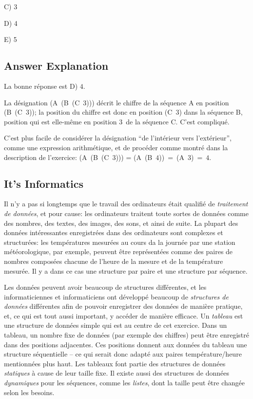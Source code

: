 \documentclass[a4paper,11pt]{report}
\newcommand{\taskGraphicsFolder}{..}
\begin{document}
C) 3

D) 4

E) 5

\endgroup

\subsection*{Answer Explanation}

La bonne réponse est D) $4$.

La désignation (A~(B~(C~$3$))) décrit le chiffre de la séquence A en position (B~(C~$3$)); la position du chiffre est donc en position (C~$3$) dans la séquence B, position qui est elle-même en position $3$~de la séquence C. C’est compliqué.

{\centering%
\par}

C’est plus facile de considérer la désignation “de l’intérieur vers l’extérieur”, comme une expression arithmétique, et de procéder comme montré dans la description de l’exercice: (A~(B~(C~$3$))) = (A~(B~$4$))~=~(A~$3$)~=~$4$.


\subsection*{It’s Informatics}

Il n’y a pas si longtemps que le travail des ordinateurs était qualifié de \emph{traitement de données}, et pour cause: les ordinateurs traitent toute sortes de données comme des nombres, des textes, des images, des sons, et ainsi de suite. La plupart des données intéressantes enregistrées dans des ordinateurs sont complexes et structurées: les températures mesurées au cours da la journée par une station météorologique, par exemple, peuvent être représentées comme des paires de nombres composées chacune de l’heure de la mesure et de la température mesurée. Il y a dans ce cas une structure par paire et une structure par séquence.

Les données peuvent avoir beaucoup de structures différentes, et les informaticiennes et informaticiens ont développé beaucoup de \emph{structures de données} différentes afin de pouvoir enregistrer des données de manière pratique, et, ce qui est tout aussi important, y accéder de manière efficace. Un \emph{tableau} est une structure de données simple qui est au centre de cet exercice. Dans un tableau, un nombre fixe de données (par exemple des chiffres) peut être enregistré dans des positions adjacentes. Ces positions donnent aux données du tableau une structure séquentielle – ce qui serait donc adapté aux paires température/heure mentionnées plus haut. Les tableaux font partie des structures de données \emph{statiques} à cause de leur taille fixe. Il existe aussi des structures de données \emph{dynamiques} pour les séquences, comme les \emph{listes}, dont la taille peut être changée selon les besoins.
\end{document}
